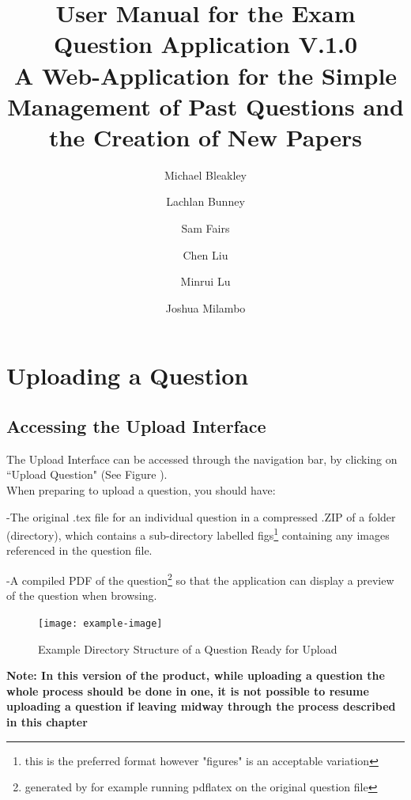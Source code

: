 \documentclass[12pt, a4paper, titlepage]{book}
\author{
    Michael Bleakley
  \and
    Lachlan Bunney
    \and
    Sam Fairs
    \and
    Chen Liu
	\and
	Minrui Lu
	\and
	Joshua Milambo
}
\begin{document}
\begin{titlepage}

\title{User Manual for the Exam Question Application V.1.0\\ \normalsize A Web-Application for the Simple Management of Past Questions and the Creation of New Papers}
\maketitle
\end{titlepage}
\tableofcontents

\chapter{Uploading a Question}
\section{Accessing the Upload Interface}
The Upload Interface can be accessed through the navigation bar, by clicking on ``Upload Question" (See Figure \label{fig:upQ}).
\\
When preparing to upload a question, you should have:\par -The original .tex file for an individual question in a compressed .ZIP of a folder (directory), which contains a sub-directory labelled figs\footnote{this is the preferred format however "figures" is an acceptable variation} containing any images referenced in the question file. \par -A compiled PDF of the question\footnote{generated by for example running pdflatex on the original question file} so that the application can display a preview of the question when browsing.
\\ \begin{figure}[htp]
\centering
\texttt{[image: example-image]}
\caption{Example Directory Structure of a Question Ready for Upload}
\end{figure}

\textbf{Note: In this version of the product, while uploading a question the whole process should be done in one, it is not possible to resume uploading a question if leaving midway through the process described in this chapter}
\pagebreak
\end{document}
